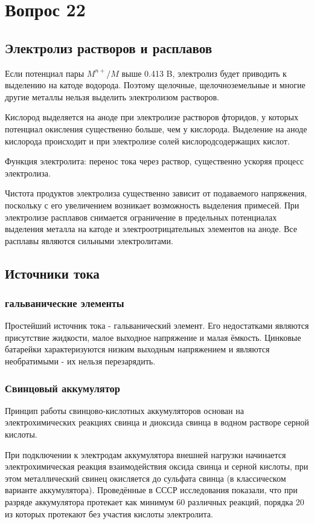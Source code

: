 \documentclass[14pt,a4paper]{scrartcl}
\begin{document}
\section*{Вопрос 22}

\subsection*{Электролиз растворов и расплавов}

Если потенциал пары $M^{n+}/M$ выше 0.413 B, электролиз будет приводить к выделению на катоде водорода. Поэтому щелочные, щелочноземельные и многие другие металлы нельзя выделить электролизом растворов.

Кислород выделяется на аноде при электролизе растворов фторидов, у которых потенциал окисления существенно больше, чем у кислорода. Выделение на аноде кислорода происходит и при электролизе солей кислородсодержащих кислот.

Функция электролита: перенос тока через раствор, существенно ускоряя процесс электролиза.

Чистота продуктов электролиза существенно зависит от подаваемого напряжения, поскольку с его увеличением возникает возможность выделения примесей. При электролизе расплавов снимается ограничение в предельных потенциалах выделения металла на катоде и электроотрицательных элементов на аноде. Все расплавы являются сильными электролитами. 

\subsection*{Источники тока}
\subsubsection*{гальванические элементы}
Простейший источник тока - гальванический элемент. Его недостатками являются присутствие жидкости, малое выходное напряжение и малая ёмкость. Цинковые батарейки характеризуются низким выходным напряжением и являются необратимыми - их нельзя перезарядить. 
\subsubsection*{Свинцовый аккумулятор}
Принцип работы свинцово-кислотных аккумуляторов основан на электрохимических реакциях свинца и диоксида свинца в водном растворе серной кислоты.

При подключении к электродам аккумулятора внешней нагрузки начинается электрохимическая реакция взаимодействия оксида свинца и серной кислоты, при этом металлический свинец окисляется до сульфата свинца (в классическом варианте аккумулятора). Проведённые в СССР исследования показали, что при разряде аккумулятора протекает как минимум 60 различных реакций, порядка 20 из которых протекают без участия кислоты электролита.
\end{document}

